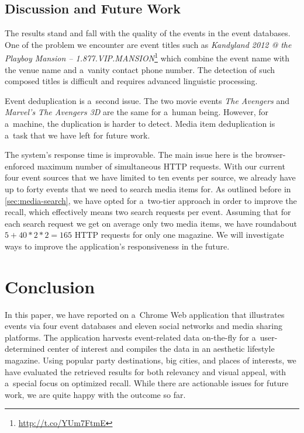 \documentclass[runningheads,a4paper]{llncs}
\begin{document}
{\subsection{Discussion and Future Work}
The results stand and fall with the quality of the events in the event databases. One of the problem we encounter are event titles such as
\emph{Kandyland 2012 @ the Playboy Mansion -- 1.877.VIP.MANSION}\footnote{\url{http://t.co/YUm7FtmE}} which combine the event name with the venue name
and a~vanity contact phone number. The detection of such composed titles is difficult and requires advanced linguistic processing.

Event deduplication is a~second issue. The two movie events \emph{The Avengers} and \emph{Marvel's The Avengers 3D} are the same for a~human being. However, for a~machine, the duplication is harder to detect. Media item deduplication is a~task that we have left for future work.

The system's response time is improvable. The main issue here is the browser-enforced maximum number of simultaneous HTTP requests. With our current four event sources that we have limited to ten events per source, we already have up to forty events that we need to search media items for. As outlined before in \autoref{sec:media-search}, we have opted for a~two-tier approach in order to improve the recall, which effectively means two search requests per event.
Assuming that for each search request we get on average only two media items, we have roundabout $5+40*2*2=165$ HTTP requests for only one magazine. We will investigate ways to improve the application's responsiveness in the future.


\section{Conclusion}                                                        \label{sec:conclusion}
In this paper, we have reported on a~Chrome Web application that illustrates events via four event databases and eleven social networks and media sharing platforms. The application harvests event-related data on-the-fly for a~user-determined center of interest and compiles the data in an aesthetic lifestyle magazine. Using popular party destinations, big cities, and places of interests, we have evaluated the retrieved results for both relevancy and visual appeal, with a~special focus on optimized recall. While there are actionable issues for future work, we are quite happy with the outcome so far.

}
\end{document}

